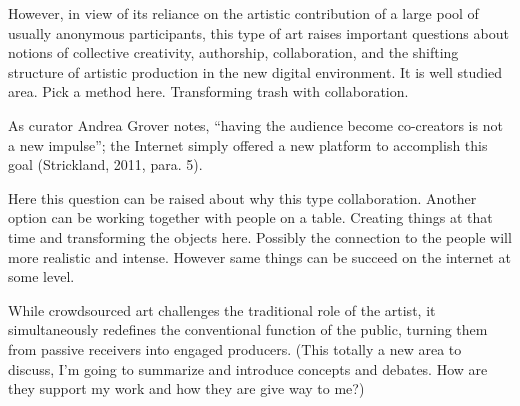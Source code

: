 However, in view of its reliance on the artistic contribution of a large pool of usually anonymous participants, this type of art raises important questions about notions of collective creativity, authorship, collaboration, and the shifting structure of artistic production in the new digital environment. It is well studied area. Pick a method here. Transforming trash with collaboration.

As curator Andrea Grover notes, “having the audience become co-creators is not a new impulse”; the Internet simply offered a new platform to accomplish this goal (Strickland, 2011, para. 5).

Here this question can be raised about why this type collaboration. Another option can be working together with people on a table. Creating things at that time and transforming the objects here. Possibly the connection to the people will more realistic and intense. However same things can be succeed on the internet at some level. 

While crowdsourced art challenges the traditional role of the artist, it simultaneously redefines the conventional function of the public, turning them from passive receivers into engaged producers. (This totally a new area to discuss, I'm going to summarize and introduce concepts and debates. How are they support my work and how they are give way to me?)











